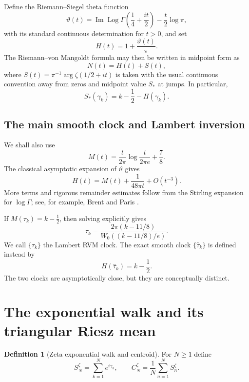 \documentclass[11pt]{amsart}
\numberwithin{equation}{section}
\theoremstyle{definition}
\newtheorem{definition}[theorem]{Definition}
\theoremstyle{remark}
\newcommand{\Log}{\operatorname{Log}}
\begin{document}
Define the Riemann--Siegel theta function
\[
\vartheta(t)=\operatorname{Im}\Log\Gamma\!\left(\frac14+\frac{it}{2}\right)-\frac t2\log\pi,
\]
with its standard continuous determination for $t>0$, and set
\[
H(t)=1+\frac{\vartheta(t)}{\pi}.
\]
The Riemann--von Mangoldt formula may then be written in midpoint form as
\[
N(t)=H(t)+S(t),
\]
where $S(t)=\pi^{-1}\arg\zeta(1/2+it)$ is taken with the usual continuous convention away from zeros and midpoint value $S_*$ at jumps.  In particular,
\begin{equation}\label{eq:midpoint}
S_*(\gamma_k)=k-\frac12-H(\gamma_k).
\end{equation}

\subsection{The main smooth clock and Lambert inversion}
We shall also use
\begin{equation}\label{eq:Mclock}
M(t)=\frac{t}{2\pi}\log\frac{t}{2\pi e}+\frac78.
\end{equation}
The classical asymptotic expansion of $\vartheta$ gives
\begin{equation}\label{eq:HminusM}
H(t)=M(t)+\frac{1}{48\pi t}+O(t^{-3}).
\end{equation}
More terms and rigorous remainder estimates follow from the Stirling expansion for $\log\Gamma$; see, for example, Brent and Paris \cite{Brent2018,Paris2020}.

If $M(\tau_k)=k-\tfrac12$, then solving explicitly gives
\begin{equation}\label{eq:Lambertinverse}
\boxed{
\tau_k=\frac{2\pi(k-11/8)}{W_0((k-11/8)/e)}.
}
\end{equation}
We call $\{\tau_k\}$ the Lambert RVM clock.  The exact smooth clock $\{\widehat\tau_k\}$ is defined instead by
\[
H(\widehat\tau_k)=k-\frac12.
\]
The two clocks are asymptotically close, but they are conceptually distinct.

\section{The exponential walk and its triangular Riesz mean}\label{sec:riesz}

\begin{definition}[Zeta exponential walk and centroid]
For $N\ge1$ define
\[
S_N^{\zeta}=\sum_{k=1}^N e^{i\gamma_k},\qquad
C_N^{\zeta}=\frac1N\sum_{n=1}^N S_n^{\zeta}.
\]
\end{definition}
\end{document}
